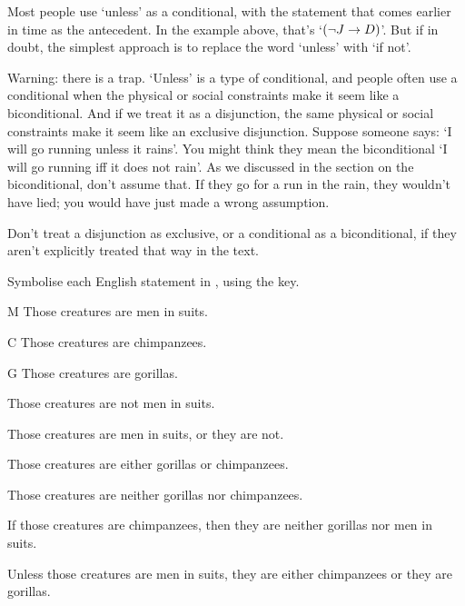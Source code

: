 \documentclass[PHIL101-Textbook.tex]{subfiles}
\begin{document}
Most people use `unless' as a conditional, with the statement that comes earlier in time as the antecedent. In the example above, that's `$(\neg J \rightarrow D)$'. But if in doubt, the simplest approach is to replace the word `unless' with `if not'.

Warning: there is a trap. `Unless' is a type of conditional, and people often use a conditional when the physical or social constraints make it seem like a biconditional. And if we treat it as a disjunction, the same physical or social constraints make it seem like an exclusive disjunction. Suppose someone says: `I will go running unless it rains'. You might think they mean the biconditional `I will go running iff it does not rain'. As we discussed in the section on the biconditional, don't assume that. If they go for a run in the rain, they wouldn't have lied; you would have just made a wrong assumption.

Don't treat a disjunction as exclusive, or a conditional as a biconditional, if they aren't explicitly treated that way in the text.




\practiceproblems
\noindent\solutions
\problempart\label{pr.monkeysuits} 
Symbolise each English statement in \tfl, using the key.
	\begin{ekey}
		\item[M] Those creatures are men in suits. 
		\item[C] Those creatures are chimpanzees. 
		\item[G] Those creatures are gorillas.
	\end{ekey}
\begin{earg}
\item Those creatures are not men in suits.
\item Those creatures are men in suits, or they are not.
\item Those creatures are either gorillas or chimpanzees.
\item Those creatures are neither gorillas nor chimpanzees.
\item If those creatures are chimpanzees, then they are neither gorillas nor men in suits.
\item Unless those creatures are men in suits, they are either chimpanzees or they are gorillas.
\end{earg}
\end{document}
